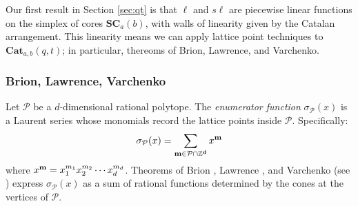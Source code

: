 \documentclass{amsart}[12pt]
\theoremstyle{definition}
\newcommand{\Z}{\mathbb{Z}}
\newcommand{\SC}{\mathbf{SC}}
\newcommand{\Cat}{\mathbf{Cat}}
\newcommand{\sk}{s\ell}
\begin{document}
Our first result in Section \ref{sec:qt} is that $\ell$ and $\sk$ are piecewise linear functions on the simplex of cores $\SC_a(b)$, with walls of linearity given by the Catalan arrangement. This linearity means we can apply lattice point techniques to $\Cat_{a,b}(q,t)$; in particular, thereoms of Brion, Lawrence, and Varchenko.





\subsubsection{Brion, Lawrence, Varchenko}
Let $\mathcal{P}$ be a $d$-dimensional rational polytope. The \emph{enumerator function} $\sigma_{\mathcal{P}}(x)$ is a Laurent series whose monomials record the lattice points inside $\mathcal{P}$. Specifically:
$$\sigma_{\mathcal{P}}(x)=\sum_{\bf{m}\in \mathcal{P}\cap \Z^d}x^{\bf{m}}$$
where $x^{\bf{m}}=x_1^{m_1}x_2^{m_2}\cdots x_d^{m_d}$.
Theorems of Brion \cite{Brion}, Lawrence \cite{Lawrence}, and Varchenko \cite{Varchenko} (see \cite{BHS}) express $\sigma_{\mathcal{P}}(x)$ as a sum of rational functions determined by the cones at the vertices of $\mathcal{P}$.
\end{document}
